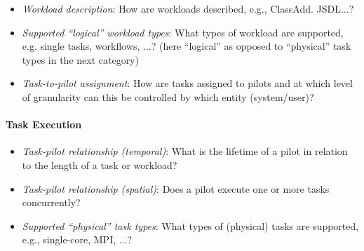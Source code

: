 \documentclass{sig-alternate}
\begin{document}
\begin{itemize}

  \item \textit{Workload description}: How are workloads described, e.g., ClassAdd. JSDL...?

  \item \textit{Supported ``logical'' workload types}: What types of workload are supported, e.g. 
    single tasks, workflows, ...? (here ``logical'' as opposed to ``physical'' task types in the next category)

  \item \textit{Task-to-pilot assignment}: How are tasks assigned to pilots and at which level of
    granularity can this be controlled by which entity (system/user)? 


\end{itemize}

\paragraph{Task Execution}

\begin{itemize}

  \item \textit{Task-pilot relationship (temporal)}: What is the lifetime of a pilot in relation to the 
    length of a task or workload?  

  \item \textit{Task-pilot relationship (spatial)}: Does a pilot execute one or more tasks concurrently? 

  \item \textit{Supported ``physical'' task types}: What types of (physical) tasks are supported, e.g., single-core, MPI, ...?

\end{itemize}




\end{document}
